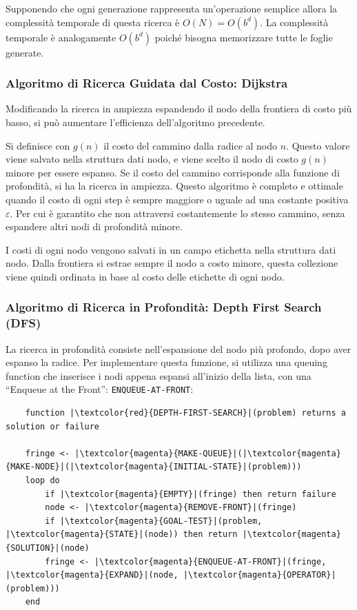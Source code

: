 \documentclass{article}
\numberwithin{equation}{subsection}
\begin{document}
Supponendo che ogni generazione rappresenta un'operazione semplice allora la complessità 
temporale di questa ricerca è $O(N)=O(b^d)$. La complessità temporale è analogamente 
$O(b^d)$ poiché bisogna memorizzare tutte le foglie generate. 

\subsubsection{Algoritmo di Ricerca Guidata dal Costo: Dijkstra}
\label{sec:Dijkstra}
Modificando la ricerca in ampiezza espandendo il nodo della frontiera di costo più basso, si può 
aumentare l'efficienza dell'algoritmo precedente. 

Si definisce con $g(n)$ il costo del cammino dalla radice al nodo $n$. Questo valore viene 
salvato nella struttura dati nodo, e viene scelto il nodo di costo $g(n)$ minore per essere 
espanso. Se il costo del cammino corrisponde alla funzione di profondità, si ha la ricerca 
in ampiezza. 
Questo algoritmo è completo e ottimale quando il costo di ogni step è sempre 
maggiore o uguale ad una costante positiva $\varepsilon$. Per cui è garantito che non attraversi 
costantemente lo stesso cammino, senza espandere altri nodi di profondità minore. 

I costi di ogni nodo vengono salvati in un campo etichetta nella struttura dati nodo. 
Dalla frontiera si estrae sempre il nodo a costo minore, questa collezione viene quindi 
ordinata in base al costo delle etichette di ogni nodo. 

\subsubsection{Algoritmo di Ricerca in Profondità: Depth First Search (DFS)}

La ricerca in profondità consiste nell'espansione del nodo più profondo, dopo aver espanso 
la radice. 
Per implementare questa funzione, si utilizza una queuing function che inserisce i nodi 
appena espansi all'inizio della lista, con una ``Enqueue at the Front'': \color{magenta}\verb|ENQUEUE-AT-FRONT|\color{black}:

\begin{verbatim}
    function |\textcolor{red}{DEPTH-FIRST-SEARCH}|(problem) returns a solution or failure
    
    fringe <- |\textcolor{magenta}{MAKE-QUEUE}|(|\textcolor{magenta}{MAKE-NODE}|(|\textcolor{magenta}{INITIAL-STATE}|(problem)))
    loop do
        if |\textcolor{magenta}{EMPTY}|(fringe) then return failure
        node <- |\textcolor{magenta}{REMOVE-FRONT}|(fringe)
        if |\textcolor{magenta}{GOAL-TEST}|(problem, |\textcolor{magenta}{STATE}|(node)) then return |\textcolor{magenta}{SOLUTION}|(node)
        fringe <- |\textcolor{magenta}{ENQUEUE-AT-FRONT}|(fringe, |\textcolor{magenta}{EXPAND}|(node, |\textcolor{magenta}{OPERATOR}|(problem)))
    end
\end{verbatim}
\end{document}
